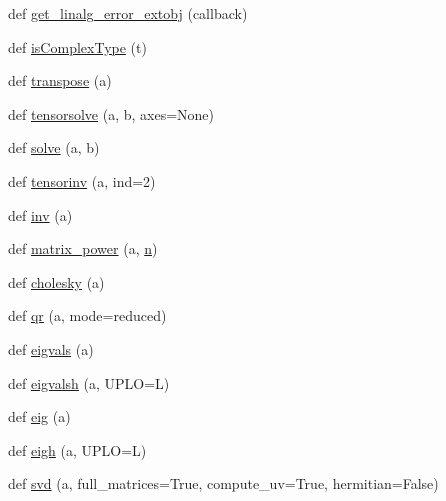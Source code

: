 \begin{DoxyCompactItemize}
\item 
def \hyperlink{namespacenumpy_1_1linalg_1_1linalg_aefbdcbc987056ba91bf0e6333ea87c54}{get\+\_\+linalg\+\_\+error\+\_\+extobj} (callback)
\item 
def \hyperlink{namespacenumpy_1_1linalg_1_1linalg_a212f5e5d2c0cff3ae7f771126dc96522}{is\+Complex\+Type} (t)
\item 
def \hyperlink{namespacenumpy_1_1linalg_1_1linalg_aa09bcb87c1535e18aab6f3601255277c}{transpose} (a)
\item 
def \hyperlink{namespacenumpy_1_1linalg_1_1linalg_a222c2c14f5480184b180a2d4da5a78b9}{tensorsolve} (a, b, axes=None)
\item 
def \hyperlink{namespacenumpy_1_1linalg_1_1linalg_af431cf925040f156dbcfdc4ac201e9a5}{solve} (a, b)
\item 
def \hyperlink{namespacenumpy_1_1linalg_1_1linalg_a150458818a0bf755f6400348ba27e21c}{tensorinv} (a, ind=2)
\item 
def \hyperlink{namespacenumpy_1_1linalg_1_1linalg_a6dd0ac871b082313d9ab0c9ef58ec57a}{inv} (a)
\item 
def \hyperlink{namespacenumpy_1_1linalg_1_1linalg_a08232cc1aa29123f9564a18e6392a335}{matrix\+\_\+power} (a, \hyperlink{namespacenumpy_a352663c52853d2754274407d5cae2832}{n})
\item 
def \hyperlink{namespacenumpy_1_1linalg_1_1linalg_abbcd94bf56ed6a02667bb3f33e7e4877}{cholesky} (a)
\item 
def \hyperlink{namespacenumpy_1_1linalg_1_1linalg_a4ddd53f396f7bd38fafbdd8488616687}{qr} (a, mode=\textquotesingle{}reduced\textquotesingle{})
\item 
def \hyperlink{namespacenumpy_1_1linalg_1_1linalg_a62097a407cd77f9997f960f3f80e6a9f}{eigvals} (a)
\item 
def \hyperlink{namespacenumpy_1_1linalg_1_1linalg_a04883f826ece6eca658d4d3c9e7db337}{eigvalsh} (a, U\+P\+LO=\textquotesingle{}L\textquotesingle{})
\item 
def \hyperlink{namespacenumpy_1_1linalg_1_1linalg_a8b3a5a4f2fc6d54fc2baf004f3b3393a}{eig} (a)
\item 
def \hyperlink{namespacenumpy_1_1linalg_1_1linalg_ab456be2ee37456d804229d08f0666927}{eigh} (a, U\+P\+LO=\textquotesingle{}L\textquotesingle{})
\item 
def \hyperlink{namespacenumpy_1_1linalg_1_1linalg_ad20d41a628c5e214b3a632bd99793e5e}{svd} (a, full\+\_\+matrices=True, compute\+\_\+uv=True, hermitian=False)
\item 

\end{DoxyCompactItemize}
